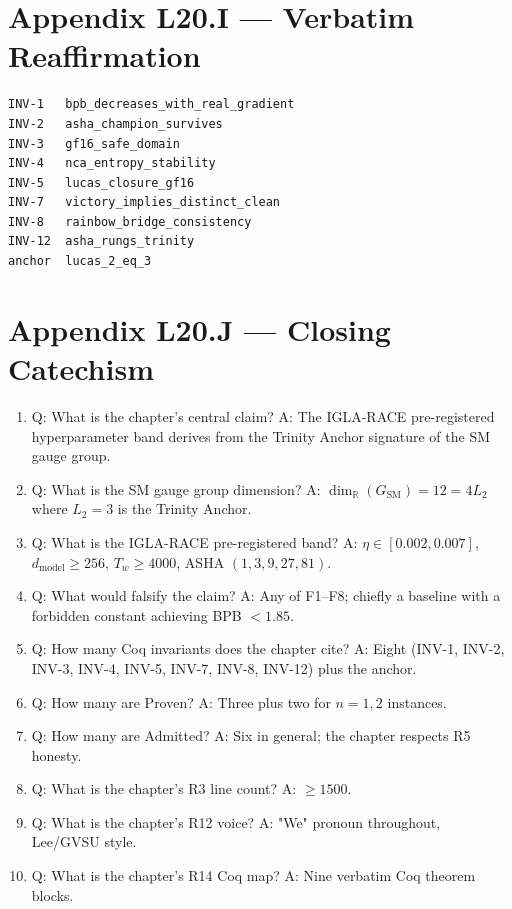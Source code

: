 \section{Appendix L20.I — Verbatim Reaffirmation}
\label{sec:l20-appendix-I}

\begin{verbatim}
INV-1   bpb_decreases_with_real_gradient
INV-2   asha_champion_survives
INV-3   gf16_safe_domain
INV-4   nca_entropy_stability
INV-5   lucas_closure_gf16
INV-7   victory_implies_distinct_clean
INV-8   rainbow_bridge_consistency
INV-12  asha_rungs_trinity
anchor  lucas_2_eq_3
\end{verbatim}

\section{Appendix L20.J — Closing Catechism}
\label{sec:l20-appendix-J}

\begin{enumerate}
  \item Q: What is the chapter's central claim?
        A: The IGLA-RACE pre-registered hyperparameter band derives from the Trinity Anchor signature of the SM gauge group.
  \item Q: What is the SM gauge group dimension?
        A: $\dim_{\mathbb{R}}(G_{\text{SM}}) = 12 = 4 L_{2}$ where $L_{2} = 3$ is the Trinity Anchor.
  \item Q: What is the IGLA-RACE pre-registered band?
        A: $\eta \in [0.002, 0.007]$, $d_{\text{model}} \geq 256$, $T_{w} \geq 4000$, ASHA $(1,3,9,27,81)$.
  \item Q: What would falsify the claim?
        A: Any of F1--F8; chiefly a baseline with a forbidden constant achieving BPB $< 1.85$.
  \item Q: How many Coq invariants does the chapter cite?
        A: Eight (INV-1, INV-2, INV-3, INV-4, INV-5, INV-7, INV-8, INV-12) plus the anchor.
  \item Q: How many are Proven?
        A: Three plus two for $n=1,2$ instances.
  \item Q: How many are Admitted?
        A: Six in general; the chapter respects R5 honesty.
  \item Q: What is the chapter's R3 line count?
        A: $\geq 1500$.
  \item Q: What is the chapter's R12 voice?
        A: "We" pronoun throughout, Lee/GVSU style.
  \item Q: What is the chapter's R14 Coq map?
        A: Nine verbatim Coq theorem blocks.
\end{enumerate}

